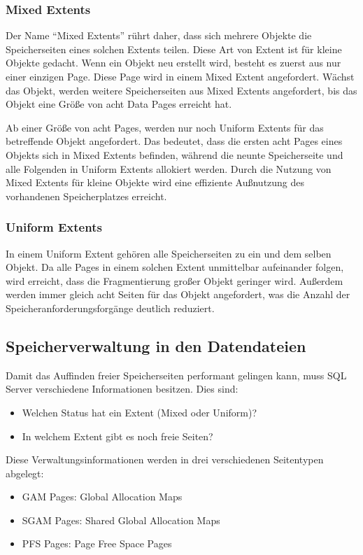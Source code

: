        \subsubsection{Mixed Extents}
          Der Name \enquote{Mixed Extents} rührt daher, dass sich mehrere
          Objekte die Speicherseiten eines solchen Extents teilen. Diese Art von
          Extent ist für kleine Objekte gedacht. Wenn ein Objekt neu erstellt
          wird, besteht es zuerst aus nur einer einzigen Page. Diese Page wird in einem Mixed
          Extent angefordert. Wächst das Objekt, werden weitere Speicherseiten
          aus Mixed Extents angefordert, bis das Objekt eine Größe von
          acht Data Pages erreicht hat.

          Ab einer Größe von acht Pages, werden nur noch Uniform Extents
          für das betreffende Objekt angefordert. Das bedeutet, dass die
          ersten acht Pages eines Objekts sich in Mixed Extents befinden,
          während die neunte Speicherseite und alle Folgenden in Uniform
          Extents allokiert werden. Durch die Nutzung von Mixed Extents für
          kleine Objekte wird eine effiziente Außnutzung des vorhandenen
          Speicherplatzes erreicht.
        \subsubsection{Uniform Extents}
          In einem Uniform Extent gehören alle Speicherseiten zu ein und dem
          selben Objekt. Da alle Pages in einem solchen Extent unmittelbar
          aufeinander folgen, wird erreicht, dass die Fragmentierung großer
          Objekt geringer wird. Außerdem werden immer gleich acht Seiten
          für das Objekt angefordert, was die Anzahl der
          Speicheranforderungsforgänge deutlich reduziert.
      \subsection{Speicherverwaltung in den Datendateien}
        Damit das Auffinden freier Speicherseiten performant gelingen kann, muss
        SQL Server verschiedene Informationen besitzen. Dies sind:
        \begin{itemize}
          \item Welchen Status hat ein Extent (Mixed oder Uniform)?
          \item In welchem Extent gibt es noch freie Seiten?
        \end{itemize}
        Diese Verwaltungsinformationen werden in drei verschiedenen Seitentypen
        abgelegt:
        \begin{itemize}
          \item GAM Pages: Global Allocation Maps
          \item SGAM  Pages: Shared Global Allocation Maps
          \item PFS Pages: Page Free Space Pages
        \end{itemize}
